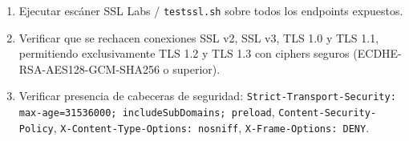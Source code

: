 \begin{enumerate}
\item Ejecutar escáner SSL Labs / \texttt{t\allowbreak{}e\allowbreak{}s\allowbreak{}t\allowbreak{}s\allowbreak{}s\allowbreak{}l\allowbreak{}.\allowbreak{}s\allowbreak{}h\allowbreak{}} sobre todos los endpoints expuestos.
\item Verificar que se rechacen conexiones SSL v2, SSL v3, TLS 1.0 y TLS 1.1, permitiendo exclusivamente TLS 1.2 y TLS 1.3 con ciphers seguros (ECDHE-RSA-AES128-GCM-SHA256 o superior).
\item Verificar presencia de cabeceras de seguridad: \texttt{S\allowbreak{}t\allowbreak{}r\allowbreak{}i\allowbreak{}c\allowbreak{}t\allowbreak{}-\allowbreak{}T\allowbreak{}r\allowbreak{}a\allowbreak{}n\allowbreak{}s\allowbreak{}p\allowbreak{}o\allowbreak{}r\allowbreak{}t\allowbreak{}-\allowbreak{}S\allowbreak{}e\allowbreak{}c\allowbreak{}u\allowbreak{}r\allowbreak{}i\allowbreak{}t\allowbreak{}y\allowbreak{}:\allowbreak{} m\allowbreak{}a\allowbreak{}x\allowbreak{}-\allowbreak{}a\allowbreak{}g\allowbreak{}e\allowbreak{}=\allowbreak{}3\allowbreak{}1\allowbreak{}5\allowbreak{}3\allowbreak{}6\allowbreak{}0\allowbreak{}0\allowbreak{}0\allowbreak{};\allowbreak{} i\allowbreak{}n\allowbreak{}c\allowbreak{}l\allowbreak{}u\allowbreak{}d\allowbreak{}e\allowbreak{}S\allowbreak{}u\allowbreak{}b\allowbreak{}D\allowbreak{}o\allowbreak{}m\allowbreak{}a\allowbreak{}i\allowbreak{}n\allowbreak{}s\allowbreak{};\allowbreak{} p\allowbreak{}r\allowbreak{}e\allowbreak{}l\allowbreak{}o\allowbreak{}a\allowbreak{}d\allowbreak{}}, \texttt{C\allowbreak{}o\allowbreak{}n\allowbreak{}t\allowbreak{}e\allowbreak{}n\allowbreak{}t\allowbreak{}-\allowbreak{}S\allowbreak{}e\allowbreak{}c\allowbreak{}u\allowbreak{}r\allowbreak{}i\allowbreak{}t\allowbreak{}y\allowbreak{}-\allowbreak{}P\allowbreak{}o\allowbreak{}l\allowbreak{}i\allowbreak{}c\allowbreak{}y\allowbreak{}}, \texttt{X\allowbreak{}-\allowbreak{}C\allowbreak{}o\allowbreak{}n\allowbreak{}t\allowbreak{}e\allowbreak{}n\allowbreak{}t\allowbreak{}-\allowbreak{}T\allowbreak{}y\allowbreak{}p\allowbreak{}e\allowbreak{}-\allowbreak{}O\allowbreak{}p\allowbreak{}t\allowbreak{}i\allowbreak{}o\allowbreak{}n\allowbreak{}s\allowbreak{}:\allowbreak{} n\allowbreak{}o\allowbreak{}s\allowbreak{}n\allowbreak{}i\allowbreak{}f\allowbreak{}f\allowbreak{}}, \texttt{X\allowbreak{}-\allowbreak{}F\allowbreak{}r\allowbreak{}a\allowbreak{}m\allowbreak{}e\allowbreak{}-\allowbreak{}O\allowbreak{}p\allowbreak{}t\allowbreak{}i\allowbreak{}o\allowbreak{}n\allowbreak{}s\allowbreak{}:\allowbreak{} D\allowbreak{}E\allowbreak{}N\allowbreak{}Y\allowbreak{}}.
\end{enumerate}
